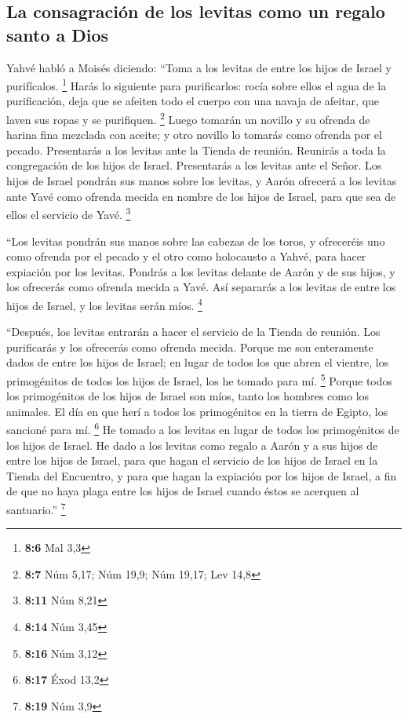 \begin{paracol}{2}
\hypertarget{la-consagraciuxf3n-de-los-levitas-como-un-regalo-santo-a-dios}{%
\subsection{La consagración de los levitas como un regalo santo a
Dios}\label{la-consagraciuxf3n-de-los-levitas-como-un-regalo-santo-a-dios}}

 Yahvé habló a Moisés diciendo:  ``Toma a
los levitas de entre los hijos de Israel y purifícalos. \footnote{\textbf{8:6}
  Mal 3,3}  Harás lo siguiente para purificarlos: rocía
sobre ellos el agua de la purificación, deja que se afeiten todo el
cuerpo con una navaja de afeitar, que laven sus ropas y se purifiquen.
\footnote{\textbf{8:7} Núm 5,17; Núm 19,9; Núm 19,17; Lev 14,8}
 Luego tomarán un novillo y su ofrenda de harina fina
mezclada con aceite; y otro novillo lo tomarás como ofrenda por el
pecado.  Presentarás a los levitas ante la Tienda de
reunión. Reunirás a toda la congregación de los hijos de Israel.
 Presentarás a los levitas ante el Señor. Los hijos de
Israel pondrán sus manos sobre los levitas,  y Aarón
ofrecerá a los levitas ante Yavé como ofrenda mecida en nombre de los
hijos de Israel, para que sea de ellos el servicio de Yavé. \footnote{\textbf{8:11}
  Núm 8,21}

 ``Los levitas pondrán sus manos sobre las cabezas de los
toros, y ofreceréis uno como ofrenda por el pecado y el otro como
holocausto a Yahvé, para hacer expiación por los levitas.
 Pondrás a los levitas delante de Aarón y de sus hijos, y
los ofrecerás como ofrenda mecida a Yavé.  Así separarás
a los levitas de entre los hijos de Israel, y los levitas serán míos.
\footnote{\textbf{8:14} Núm 3,45}

 ``Después, los levitas entrarán a hacer el servicio de
la Tienda de reunión. Los purificarás y los ofrecerás como ofrenda
mecida.  Porque me son enteramente dados de entre los
hijos de Israel; en lugar de todos los que abren el vientre, los
primogénitos de todos los hijos de Israel, los he tomado para mí.
\footnote{\textbf{8:16} Núm 3,12}  Porque todos los
primogénitos de los hijos de Israel son míos, tanto los hombres como los
animales. El día en que herí a todos los primogénitos en la tierra de
Egipto, los sancioné para mí. \footnote{\textbf{8:17} Éxod 13,2}
 He tomado a los levitas en lugar de todos los
primogénitos de los hijos de Israel.  He dado a los
levitas como regalo a Aarón y a sus hijos de entre los hijos de Israel,
para que hagan el servicio de los hijos de Israel en la Tienda del
Encuentro, y para que hagan la expiación por los hijos de Israel, a fin
de que no haya plaga entre los hijos de Israel cuando éstos se acerquen
al santuario.'' \footnote{\textbf{8:19} Núm 3,9}


\end{paracol}
